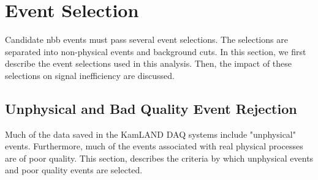 \section{Event Selection}
Candidate \0nbb events must pass several event selections. The selections are separated into non-physical events and background cuts. In this section, we first describe the event selections used in this analysis. Then, the impact of these selections on signal inefficiency are discussed.

\subsection{Unphysical and Bad Quality Event Rejection}
\label{sec:badqualityevents}
Much of the data saved in the KamLAND DAQ systems include "unphysical" events. Furthermore, much of the events associated with real physical processes are of poor quality. This section, describes the criteria by which unphysical events and poor quality events are selected.
